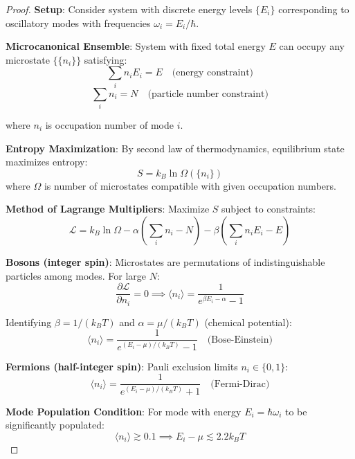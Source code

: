 \documentclass[11pt,onecolumn]{article}
\begin{document}
\begin{proof}
\textbf{Setup}: Consider system with discrete energy levels $\{E_i\}$ corresponding to oscillatory modes with frequencies $\omega_i = E_i / \hbar$.

\textbf{Microcanonical Ensemble}: System with fixed total energy $E$ can occupy any microstate $\{\{n_i\}\}$ satisfying:
\begin{equation}
\sum_i n_i E_i = E \quad \text{(energy constraint)}
\end{equation}
\begin{equation}
\sum_i n_i = N \quad \text{(particle number constraint)}
\end{equation}

where $n_i$ is occupation number of mode $i$.

\textbf{Entropy Maximization}: By second law of thermodynamics, equilibrium state maximizes entropy:
\begin{equation}
S = k_B \ln \Omega(\{n_i\})
\end{equation}
where $\Omega$ is number of microstates compatible with given occupation numbers.

\textbf{Method of Lagrange Multipliers}: Maximize $S$ subject to constraints:
\begin{equation}
\mathcal{L} = k_B \ln \Omega - \alpha \left(\sum_i n_i - N\right) - \beta \left(\sum_i n_i E_i - E\right)
\end{equation}

\textbf{Bosons (integer spin)}: Microstates are permutations of indistinguishable particles among modes. For large $N$:
\begin{equation}
\frac{\partial \mathcal{L}}{\partial n_i} = 0 \implies \langle n_i \rangle = \frac{1}{e^{\beta E_i - \alpha} - 1}
\end{equation}

Identifying $\beta = 1/(k_B T)$ and $\alpha = \mu/(k_B T)$ (chemical potential):
\begin{equation}
\langle n_i \rangle = \frac{1}{e^{(E_i - \mu)/(k_B T)} - 1} \quad \text{(Bose-Einstein)}
\end{equation}

\textbf{Fermions (half-integer spin)}: Pauli exclusion limits $n_i \in \{0, 1\}$:
\begin{equation}
\langle n_i \rangle = \frac{1}{e^{(E_i - \mu)/(k_B T)} + 1} \quad \text{(Fermi-Dirac)}
\end{equation}

\textbf{Mode Population Condition}: For mode with energy $E_i = \hbar \omega_i$ to be significantly populated:
\begin{equation}
\langle n_i \rangle \gtrsim 0.1 \implies E_i - \mu \lesssim 2.2 k_B T
\end{equation}


\end{proof}
\end{document}
